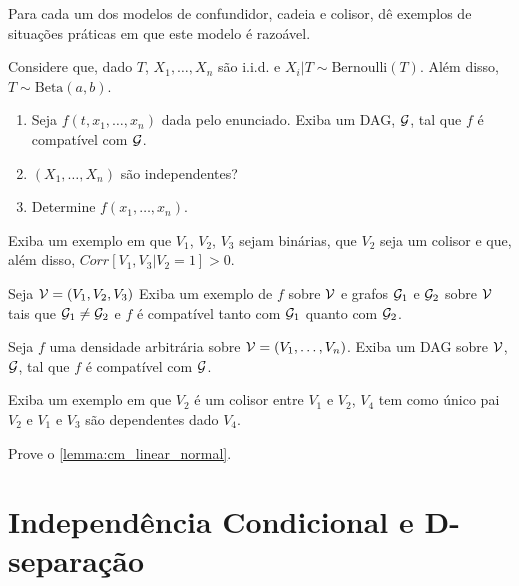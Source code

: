 \begin{exercise}
 Para cada um dos modelos de confundidor, cadeia e colisor,
 dê exemplos de situações práticas em que este modelo é razoável.
\end{exercise}

\begin{exercise}
 Considere que, dado $T$, $X_1,\ldots,X_n$ são i.i.d. e
 $X_i|T \sim \text{Bernoulli}(T)$. Além disso,
 $T \sim \text{Beta}(a,b)$.
 \begin{enumerate}[label=(\alph*)]
  \item Seja $f(t,x_1,\ldots,x_n)$ dada pelo enunciado.
  Exiba um DAG, ${\mathcal G}$, tal que $f$ é compatível com ${\mathcal G}$.
  \item $(X_1,\ldots,X_n)$ são independentes?
  \item Determine $f(x_1,\ldots,x_n)$.
 \end{enumerate}
\end{exercise}

\begin{exercise}
 Exiba um exemplo em que $V_1$, $V_2$, $V_3$ sejam binárias,
 que $V_2$ seja um colisor e que, além disso,
 $Corr[V_1,V_3|V_2=1] > 0$.
\end{exercise}

\begin{exercise}
 Seja ${\mathcal V} = (V_1, V_2, V_3)$
 Exiba um exemplo de $f$ sobre ${\mathcal V}$ e
 grafos ${\mathcal G}_1$ e ${\mathcal G}_2$ sobre ${\mathcal V}$ tais que
 ${\mathcal G}_1 \neq {\mathcal G}_2$ e
 $f$ é compatível tanto com ${\mathcal G}_1$ 
 quanto com ${\mathcal G}_2$.
\end{exercise}

\begin{exercise}
 Seja $f$ uma densidade arbitrária sobre ${\mathcal V} = (V_1,\ldots,V_n)$.
 Exiba um DAG sobre ${\mathcal V}$, ${\mathcal G}$,
 tal que $f$ é compatível com ${\mathcal G}$.
\end{exercise}

\begin{exercise}
 Exiba um exemplo em que $V_2$ é um colisor 
 entre $V_1$ e $V_2$, 
 $V_4$ tem como único pai $V_2$ e
 $V_1$ e $V_3$ são dependentes dado $V_4$.
\end{exercise}

\begin{exercise}
 Prove o \cref{lemma:cm_linear_normal}.
\end{exercise}

\section{Independência Condicional e D-separação}
\label{sec:d-sep}

